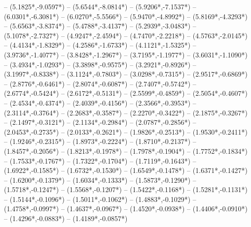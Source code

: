 {	-- ({5.1825*\dx},{-9.0597*\dy})
	-- ({5.6544*\dx},{-8.0814*\dy})
	-- ({5.9206*\dx},{-7.1537*\dy})
	-- ({6.0301*\dx},{-6.3081*\dy})
	-- ({6.0270*\dx},{-5.5566*\dy})
	-- ({5.9470*\dx},{-4.8992*\dy})
	-- ({5.8169*\dx},{-4.3293*\dy})
	-- ({5.6563*\dx},{-3.8374*\dy})
	-- ({5.4788*\dx},{-3.4137*\dy})
	-- ({5.2939*\dx},{-3.0483*\dy})
	-- ({5.1078*\dx},{-2.7327*\dy})
	-- ({4.9247*\dx},{-2.4594*\dy})
	-- ({4.7470*\dx},{-2.2218*\dy})
	-- ({4.5763*\dx},{-2.0145*\dy})
	-- ({4.4134*\dx},{-1.8329*\dy})
	-- ({4.2586*\dx},{-1.6733*\dy})
	-- ({4.1121*\dx},{-1.5325*\dy})
	-- ({3.9736*\dx},{-1.4077*\dy})
	-- ({3.8428*\dx},{-1.2967*\dy})
	-- ({3.7195*\dx},{-1.1977*\dy})
	-- ({3.6031*\dx},{-1.1090*\dy})
	-- ({3.4934*\dx},{-1.0293*\dy})
	-- ({3.3898*\dx},{-0.9575*\dy})
	-- ({3.2921*\dx},{-0.8926*\dy})
	-- ({3.1997*\dx},{-0.8338*\dy})
	-- ({3.1124*\dx},{-0.7803*\dy})
	-- ({3.0298*\dx},{-0.7315*\dy})
	-- ({2.9517*\dx},{-0.6869*\dy})
	-- ({2.8776*\dx},{-0.6461*\dy})
	-- ({2.8074*\dx},{-0.6087*\dy})
	-- ({2.7407*\dx},{-0.5742*\dy})
	-- ({2.6774*\dx},{-0.5424*\dy})
	-- ({2.6172*\dx},{-0.5131*\dy})
	-- ({2.5599*\dx},{-0.4859*\dy})
	-- ({2.5054*\dx},{-0.4607*\dy})
	-- ({2.4534*\dx},{-0.4374*\dy})
	-- ({2.4039*\dx},{-0.4156*\dy})
	-- ({2.3566*\dx},{-0.3953*\dy})
	-- ({2.3114*\dx},{-0.3764*\dy})
	-- ({2.2683*\dx},{-0.3587*\dy})
	-- ({2.2270*\dx},{-0.3422*\dy})
	-- ({2.1875*\dx},{-0.3267*\dy})
	-- ({2.1497*\dx},{-0.3121*\dy})
	-- ({2.1134*\dx},{-0.2984*\dy})
	-- ({2.0787*\dx},{-0.2856*\dy})
	-- ({2.0453*\dx},{-0.2735*\dy})
	-- ({2.0133*\dx},{-0.2621*\dy})
	-- ({1.9826*\dx},{-0.2513*\dy})
	-- ({1.9530*\dx},{-0.2411*\dy})
	-- ({1.9246*\dx},{-0.2315*\dy})
	-- ({1.8973*\dx},{-0.2224*\dy})
	-- ({1.8710*\dx},{-0.2137*\dy})
	-- ({1.8457*\dx},{-0.2056*\dy})
	-- ({1.8213*\dx},{-0.1978*\dy})
	-- ({1.7978*\dx},{-0.1904*\dy})
	-- ({1.7752*\dx},{-0.1834*\dy})
	-- ({1.7533*\dx},{-0.1767*\dy})
	-- ({1.7322*\dx},{-0.1704*\dy})
	-- ({1.7119*\dx},{-0.1643*\dy})
	-- ({1.6922*\dx},{-0.1585*\dy})
	-- ({1.6732*\dx},{-0.1530*\dy})
	-- ({1.6549*\dx},{-0.1478*\dy})
	-- ({1.6371*\dx},{-0.1427*\dy})
	-- ({1.6200*\dx},{-0.1379*\dy})
	-- ({1.6034*\dx},{-0.1333*\dy})
	-- ({1.5873*\dx},{-0.1290*\dy})
	-- ({1.5718*\dx},{-0.1247*\dy})
	-- ({1.5568*\dx},{-0.1207*\dy})
	-- ({1.5422*\dx},{-0.1168*\dy})
	-- ({1.5281*\dx},{-0.1131*\dy})
	-- ({1.5144*\dx},{-0.1096*\dy})
	-- ({1.5011*\dx},{-0.1062*\dy})
	-- ({1.4883*\dx},{-0.1029*\dy})
	-- ({1.4758*\dx},{-0.0997*\dy})
	-- ({1.4637*\dx},{-0.0967*\dy})
	-- ({1.4520*\dx},{-0.0938*\dy})
	-- ({1.4406*\dx},{-0.0910*\dy})
	-- ({1.4296*\dx},{-0.0883*\dy})
	-- ({1.4189*\dx},{-0.0857*\dy})
}
